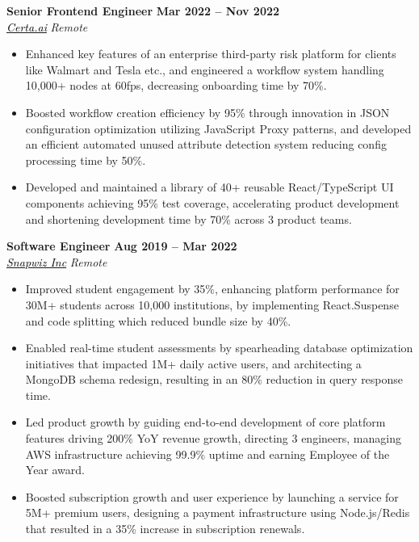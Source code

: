 \documentclass[10pt,letterpaper]{article}
\begin{document}
\vspace{1mm}
\hspace{0in}\textbf{Senior Frontend Engineer} \hfill \textbf{Mar 2022 -- Nov 2022}\\
\hspace{0in}\textit{\href{https://certa.ai}{\textcolor{black}{Certa.ai}}} \hfill \textit{Remote} 
\begin{itemize}[leftmargin=0.15in,nosep,topsep=3pt,itemsep=1mm]
   \item Enhanced key features of an enterprise third-party risk platform for clients like Walmart and Tesla etc., and engineered a workflow system handling 10,000+ nodes at 60fps, decreasing onboarding time by 70\%.
     \item Boosted workflow creation efficiency by 95\% through innovation in JSON configuration optimization utilizing JavaScript Proxy patterns, and developed an efficient automated unused attribute detection system reducing config processing time by 50\%.
   \item Developed and maintained a library of 40+ reusable React/TypeScript UI components achieving 95\% test coverage, accelerating product development and shortening development time by 70\% across 3 product teams.
\end{itemize}

\vspace{1mm}
\hspace{0in}\textbf{Software Engineer} \hfill \textbf{Aug 2019 -- Mar 2022}\\
\hspace{0in}\textit{\href{https://edulastic.com}{\textcolor{black}{Snapwiz Inc}}} \hfill \textit{Remote} 
\begin{itemize}[leftmargin=0.15in,nosep,topsep=3pt,itemsep=1mm]
   \item Improved student engagement by 35\%, enhancing platform performance for 30M+ students across 10,000 institutions, by implementing React.Suspense and code splitting which reduced bundle size by 40\%.
 \item Enabled real-time student assessments by spearheading database optimization initiatives that impacted 1M+ daily active users, and architecting a MongoDB schema redesign, resulting in an 80\% reduction in query response time.
 \item Led product growth by guiding end-to-end development of core platform features driving 200\% YoY revenue growth, directing 3 engineers, managing AWS infrastructure achieving 99.9\% uptime and earning Employee of the Year award.
 \item Boosted subscription growth and user experience by launching a service for 5M+ premium users, designing a payment infrastructure using Node.js/Redis that resulted in a 35\% increase in subscription renewals.
\end{itemize}
\end{document}
